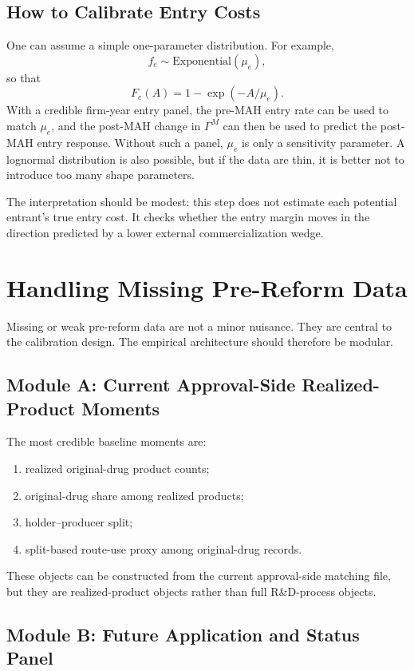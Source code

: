 \documentclass[12pt]{article}
\newcommand{\1}{\mathbf{1}}
\begin{document}
\subsection{How to Calibrate Entry Costs}

One can assume a simple one-parameter distribution. For example,
\[
    f_e\sim \text{Exponential}(\mu_e),
\]
so that
\[
    F_e(A)=1-\exp(-A/\mu_e).
\]
With a credible firm-year entry panel, the pre-MAH entry rate can be used to match $\mu_e$, and the post-MAH change in $\Gamma^M$ can then be used to predict the post-MAH entry response. Without such a panel, $\mu_e$ is only a sensitivity parameter. A lognormal distribution is also possible, but if the data are thin, it is better not to introduce too many shape parameters.

The interpretation should be modest: this step does not estimate each potential entrant's true entry cost. It checks whether the entry margin moves in the direction predicted by a lower external commercialization wedge.

\section{Handling Missing Pre-Reform Data}

Missing or weak pre-reform data are not a minor nuisance. They are central to the calibration design. The empirical architecture should therefore be modular.

\subsection{Module A: Current Approval-Side Realized-Product Moments}

The most credible baseline moments are:
\begin{enumerate}[leftmargin=2em]
    \item realized original-drug product counts;
    \item original-drug share among realized products;
    \item holder--producer split;
    \item split-based route-use proxy among original-drug records.
\end{enumerate}
These objects can be constructed from the current approval-side matching file, but they are realized-product objects rather than full R\&D-process objects.

\subsection{Module B: Future Application and Status Panel}
\end{document}

